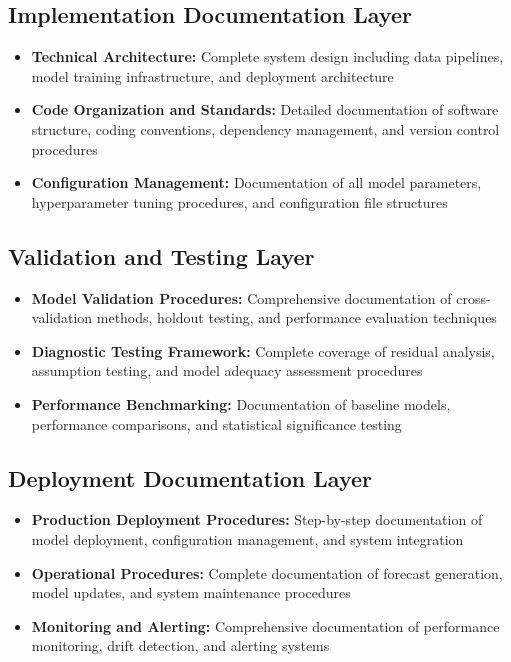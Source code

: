 \subsection{Implementation Documentation Layer}
\begin{itemize}
	\item \textbf{Technical Architecture:} Complete system design including data pipelines, model training infrastructure, and deployment architecture
	\item \textbf{Code Organization and Standards:} Detailed documentation of software structure, coding conventions, dependency management, and version control procedures
	\item \textbf{Configuration Management:} Documentation of all model parameters, hyperparameter tuning procedures, and configuration file structures
\end{itemize}

\subsection{Validation and Testing Layer}
\begin{itemize}
	\item \textbf{Model Validation Procedures:} Comprehensive documentation of cross-validation methods, holdout testing, and performance evaluation techniques
	\item \textbf{Diagnostic Testing Framework:} Complete coverage of residual analysis, assumption testing, and model adequacy assessment procedures \cite{Montgomery:2008}
	\item \textbf{Performance Benchmarking:} Documentation of baseline models, performance comparisons, and statistical significance testing
\end{itemize}

\subsection{Deployment Documentation Layer}
\begin{itemize}
	\item \textbf{Production Deployment Procedures:} Step-by-step documentation of model deployment, configuration management, and system integration
	\item \textbf{Operational Procedures:} Complete documentation of forecast generation, model updates, and system maintenance procedures
	\item \textbf{Monitoring and Alerting:} Comprehensive documentation of performance monitoring, drift detection, and alerting systems
\end{itemize}

